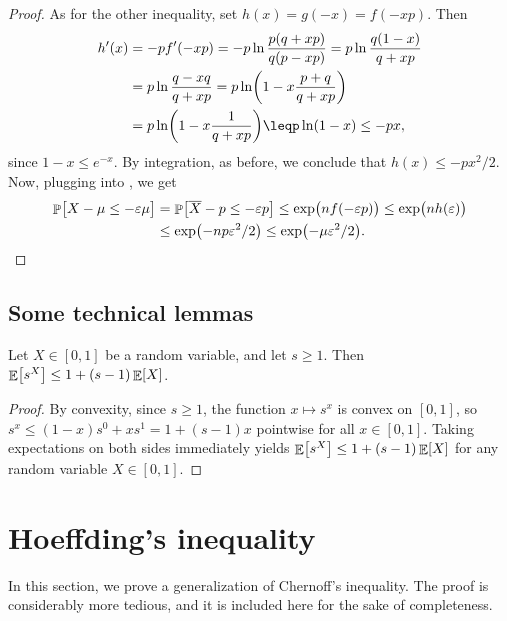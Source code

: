 \begin{proof}
    As for the other inequality, set $h(x) = g(-x) = f(-xp)$. Then
    \begin{align*}
        h'(x)%
        &=%
        -p f'(-xp)%
        =%
        -p\ln \frac{p(q+xp)}{q(p-xp)} %
        =%
        p\ln \frac{q(1-x)}{q+xp} \\
        &=%
        p\ln \frac{q-xq}{q+xp} %
        =%
        p\ln\pth{ 1 - x\frac{p+q}{q+xp}} %
        \\&%
        =%
        p\ln\pth{ 1 - x\frac{1}{q+xp}} %
        \leq%
        p\ln\pth{ 1 - x} %
        \leq%
        -p x,
    \end{align*}
    since $1-x \leq e^{-x}$.  By integration, as before, we conclude
    that $h(x) \leq -p x^2/2$.  Now, plugging into ,
    we get
    \begin{align*}
        \Prob{\bigl.{X} - \mu \leq -\eps \mu }%
        &=%
        \Prob{\bigl.\overline{X} - p \leq -\eps p }%
        \leq%
        \exp\pth{ \bigl. n f(-\eps p)}%
        \leq%
        \exp\pth{ \bigl. n h(\eps )}%
        \\&\leq%
        \exp\pth{ \bigl. -n p \eps^2/2}%
        \leq%
        \exp\pth{ \bigl. - \mu \eps^2/2}.
    \end{align*}
\end{proof}

\subsection{Some technical lemmas}

\begin{lemma}
    Let $X \in [0,1]$ be a random variable, and let $s \geq 1$. Then
    $\mathop{\mathbb{E}}\!\left[ {s^X} \right] \leq 1 + (s-1)\mathop{\mathbb{E}}\!\left[ {X} \right]$.
\end{lemma}
\begin{proof}
    By convexity, since $s \geq 1$, the function $x \mapsto s^x$ is convex on
    $[0, 1]$, so $s^x \leq (1-x)s^0 + x s^1 = 1 + (s-1)x$ pointwise for all
    $x \in [0, 1]$. Taking expectations on both sides immediately yields
    $\mathop{\mathbb{E}}\!\left[ {s^X} \right] \leq 1 + (s-1)\mathop{\mathbb{E}}\!\left[ {X} \right]$ for any random variable $X \in [0, 1]$.
\end{proof}



\section{Hoeffding's inequality}

In this section, we prove a generalization of Chernoff's
inequality. The proof is considerably more tedious, and it is included
here for the sake of completeness.


